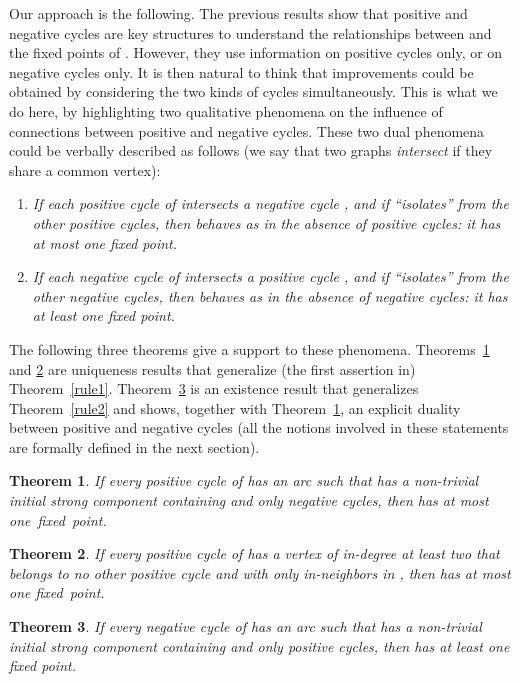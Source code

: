 \documentclass[11pt,a4paper]{article}
\newtheorem{theorem}{Theorem}
\begin{document}
\medskip
Our approach is the following. The previous results show that positive and negative cycles are key structures to understand the relationships between  and the fixed points of . However, they use information on positive cycles only, or on negative cycles only. It is then natural to think that improvements could be obtained by considering the two kinds of cycles simultaneously. This is what we do here, by highlighting two qualitative phenomena on the influence of connections between positive and negative cycles. These two dual phenomena could be verbally described as follows (we say that two graphs {\em intersect} if they share a common vertex): 
\begin{enumerate}
\item
{\em If each positive cycle  of  intersects a negative cycle , and if   ``isolates''  from the other positive cycles, then  behaves as in the absence of positive cycles: it has at most  one fixed point.} 
\item
{\em If each negative cycle  of  intersects a positive cycle , and if   ``isolates''  from the other negative cycles, then  behaves as in the absence of negative cycles: it has at least one fixed point.}
\end{enumerate}

The following three theorems give a support to these phenomena. Theorems~\ref{newrule1} and \ref{renewrule1} are uniqueness results that generalize (the first assertion in) Theorem~\ref{rule1}. Theorem~\ref{newrule2} is an existence result that generalizes Theorem~\ref{rule2} and shows, together with Theorem~\ref{newrule1}, an explicit duality between positive and negative cycles (all the notions involved in these statements are formally defined in the next section). 

\begin{theorem}\label{newrule1}
If every positive cycle of  has an arc  such that  has a non-trivial initial strong component containing  and only negative cycles, then  has at most one~fixed~point.
\end{theorem}


\begin{theorem}\label{renewrule1}
If every positive cycle  of  has a vertex  of in-degree at least two that belongs to no other positive cycle and with only in-neighbors in , then  has at most one fixed~point. 
\end{theorem} 

\begin{theorem}\label{newrule2}
If every negative cycle of  has an arc  such that  has a non-trivial initial strong component containing  and only positive cycles, then  has at least one fixed point.
\end{theorem}
\end{document}
